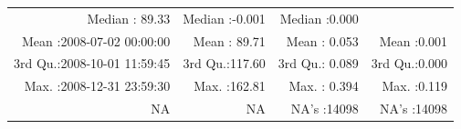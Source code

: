 \documentclass[
  10pt,
  a4paper,oneside]{article}
\begin{document}
\begin{longtable}[]{@{}rrrr@{}}
\begin{minipage}[t]{0.19\columnwidth}
Median : 89.33\strut
\end{minipage} & \begin{minipage}[t]{0.19\columnwidth}\raggedleft
Median :-0.001\strut
\end{minipage} & \begin{minipage}[t]{0.19\columnwidth}\raggedleft
Median :0.000\strut
\end{minipage}\tabularnewline
\begin{minipage}[t]{0.33\columnwidth}\raggedleft
Mean :2008-07-02 00:00:00\strut
\end{minipage} & \begin{minipage}[t]{0.19\columnwidth}\raggedleft
Mean : 89.71\strut
\end{minipage} & \begin{minipage}[t]{0.19\columnwidth}\raggedleft
Mean : 0.053\strut
\end{minipage} & \begin{minipage}[t]{0.19\columnwidth}\raggedleft
Mean :0.001\strut
\end{minipage}\tabularnewline
\begin{minipage}[t]{0.33\columnwidth}\raggedleft
3rd Qu.:2008-10-01 11:59:45\strut
\end{minipage} & \begin{minipage}[t]{0.19\columnwidth}\raggedleft
3rd Qu.:117.60\strut
\end{minipage} & \begin{minipage}[t]{0.19\columnwidth}\raggedleft
3rd Qu.: 0.089\strut
\end{minipage} & \begin{minipage}[t]{0.19\columnwidth}\raggedleft
3rd Qu.:0.000\strut
\end{minipage}\tabularnewline
\begin{minipage}[t]{0.33\columnwidth}\raggedleft
Max. :2008-12-31 23:59:30\strut
\end{minipage} & \begin{minipage}[t]{0.19\columnwidth}\raggedleft
Max. :162.81\strut
\end{minipage} & \begin{minipage}[t]{0.19\columnwidth}\raggedleft
Max. : 0.394\strut
\end{minipage} & \begin{minipage}[t]{0.19\columnwidth}\raggedleft
Max. :0.119\strut
\end{minipage}\tabularnewline
\begin{minipage}[t]{0.33\columnwidth}\raggedleft
NA\strut
\end{minipage} & \begin{minipage}[t]{0.19\columnwidth}\raggedleft
NA\strut
\end{minipage} & \begin{minipage}[t]{0.19\columnwidth}\raggedleft
NA's :14098\strut
\end{minipage} & \begin{minipage}[t]{0.19\columnwidth}\raggedleft
NA's :14098\strut
\end{minipage}\tabularnewline
\bottomrule
\end{longtable}
\end{document}
